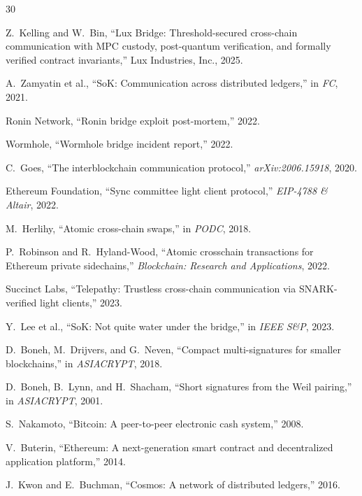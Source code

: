 
\begin{thebibliography}{30}

Z.~Kelling and W.~Bin, ``Lux Bridge: Threshold-secured cross-chain communication with MPC custody, post-quantum verification, and formally verified contract invariants,'' Lux Industries, Inc., 2025.

A.~Zamyatin et al., ``SoK: Communication across distributed ledgers,'' in \emph{FC}, 2021.

Ronin Network, ``Ronin bridge exploit post-mortem,'' 2022.

Wormhole, ``Wormhole bridge incident report,'' 2022.

C.~Goes, ``The interblockchain communication protocol,'' \emph{arXiv:2006.15918}, 2020.

Ethereum Foundation, ``Sync committee light client protocol,'' \emph{EIP-4788 \& Altair}, 2022.

M.~Herlihy, ``Atomic cross-chain swaps,'' in \emph{PODC}, 2018.

P.~Robinson and R.~Hyland-Wood, ``Atomic crosschain transactions for Ethereum private sidechains,'' \emph{Blockchain: Research and Applications}, 2022.

Succinct Labs, ``Telepathy: Trustless cross-chain communication via SNARK-verified light clients,'' 2023.

Y.~Lee et al., ``SoK: Not quite water under the bridge,'' in \emph{IEEE S\&P}, 2023.

D.~Boneh, M.~Drijvers, and G.~Neven, ``Compact multi-signatures for smaller blockchains,'' in \emph{ASIACRYPT}, 2018.

D.~Boneh, B.~Lynn, and H.~Shacham, ``Short signatures from the Weil pairing,'' in \emph{ASIACRYPT}, 2001.

S.~Nakamoto, ``Bitcoin: A peer-to-peer electronic cash system,'' 2008.

V.~Buterin, ``Ethereum: A next-generation smart contract and decentralized application platform,'' 2014.

J.~Kwon and E.~Buchman, ``Cosmos: A network of distributed ledgers,'' 2016.


\end{thebibliography}
